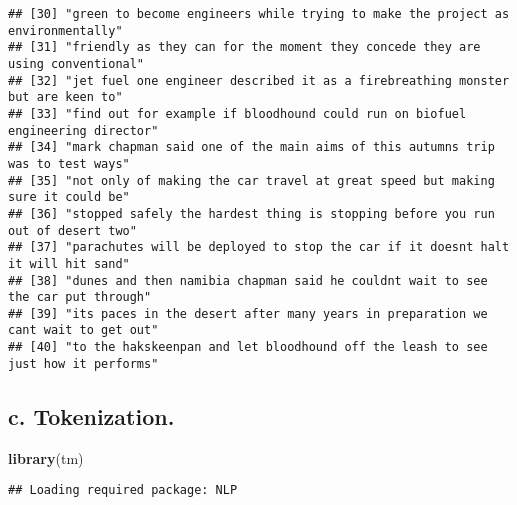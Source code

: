 \documentclass[]{article}
\newenvironment{Shaded}{\begin{snugshade}}{\end{snugshade}}
\newcommand{\DataTypeTok}[1]{\textcolor[rgb]{0.13,0.29,0.53}{#1}}
\newcommand{\DecValTok}[1]{\textcolor[rgb]{0.00,0.00,0.81}{#1}}
\newcommand{\KeywordTok}[1]{\textcolor[rgb]{0.13,0.29,0.53}{\textbf{#1}}}
\newcommand{\NormalTok}[1]{#1}
\newcommand{\OperatorTok}[1]{\textcolor[rgb]{0.81,0.36,0.00}{\textbf{#1}}}
\newcommand{\OtherTok}[1]{\textcolor[rgb]{0.56,0.35,0.01}{#1}}
\newcommand{\StringTok}[1]{\textcolor[rgb]{0.31,0.60,0.02}{#1}}
\begin{document}
\begin{verbatim}
## [30] "green to become engineers while trying to make the project as environmentally"  
## [31] "friendly as they can for the moment they concede they are using conventional"   
## [32] "jet fuel one engineer described it as a firebreathing monster but are keen to"  
## [33] "find out for example if bloodhound could run on biofuel engineering director"   
## [34] "mark chapman said one of the main aims of this autumns trip was to test ways"   
## [35] "not only of making the car travel at great speed but making sure it could be"   
## [36] "stopped safely the hardest thing is stopping before you run out of desert two"  
## [37] "parachutes will be deployed to stop the car if it doesnt halt it will hit sand" 
## [38] "dunes and then namibia chapman said he couldnt wait to see the car put through" 
## [39] "its paces in the desert after many years in preparation we cant wait to get out"
## [40] "to the hakskeenpan and let bloodhound off the leash to see just how it performs"
\end{verbatim}

\hypertarget{c.-tokenization.}{%
\subsection{c. Tokenization.}\label{c.-tokenization.}}

\begin{Shaded}
\begin{Highlighting}[]
\KeywordTok{library}\NormalTok{(tm)}
\end{Highlighting}
\end{Shaded}

\begin{verbatim}
## Loading required package: NLP
\end{verbatim}

\begin{Shaded}
\end{Shaded}
\end{document}
